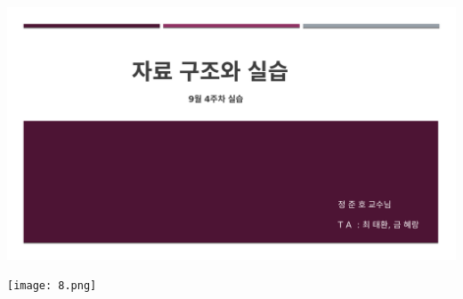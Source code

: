 \documentclass[11pt,a4paper]{article}
\begin{document}
\newpage
\includegraphics[page=6, width=\textwidth]{1.pdf}
\newpage
	
\texttt{[image: 8.png]}	
\end{document}
